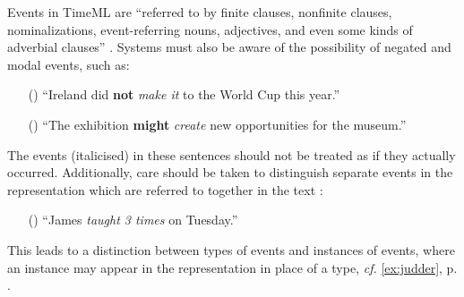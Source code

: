 \documentclass[a4paper,12pt,leqno]{article}
\newcommand{\ipp}{(\refstepcounter{equation}\theequation)}
\begin{document}
Events in TimeML are ``referred to by finite clauses, nonfinite clauses, nominalizations, event-referring nouns, adjectives, and even some kinds of adverbial clauses'' \citep[p. 133]{Pustejovsky2005}. Systems must also be aware of the possibility of negated and modal events, such as:
\begin{itemize}
	\item[\ipp] ``Ireland did \textbf{not} \textit{make it} to the World Cup this year.''
	\item[\ipp] ``The exhibition \textbf{might} \textit{create} new opportunities for the museum.''
\end{itemize}
The events (italicised) in these sentences should not be treated as if they actually occurred. Additionally, care should be taken to distinguish separate events in the representation which are referred to together in the text \citep[p. 134, (32a.)]{Pustejovsky2005}:
\begin{itemize}
	\item[\ipp\label{other:pustejovsky-type-instance}] ``James \textit{taught 3 times} on Tuesday.''
\end{itemize}
This leads to a distinction between types of events and instances of events, where an instance may appear in the representation in place of a type, \textit{cf.} \cref{ex:judder}, p. \pageref{ex:judder}.
\end{document}
